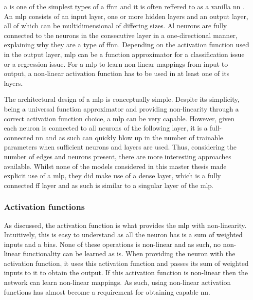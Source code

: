 a  is one of the simplest types of a \gls{ffnn} and it is often reffered to as a vanilla \gls{nn} \citep{ml_book}.
An \gls{mlp} consists of an input layer, one or more hidden layers and an output layer, all of which can be multidimensional of differing sizes.
Al neurons are fully connected to the neurons in the consecutive layer in a one-directional manner, explaining why they are a type of \gls{ffnn}.
Depending on the activation function used in the output layer, \gls{mlp} can be a function approximator for a classification issue or a regression issue.
For a \gls{mlp} to learn non-linear mappings from input to output, a non-linear activation function has to be used in at least one of its layers.

The architectural design of a \gls{mlp} is conceptually simple.
Despite its simplicity, being a universal function approximator and providing non-linearity through a correct activation function choice, a \gls{mlp} can be very capable.
However, given each neuron is connected to all neurons of the following layer, it is a full-connected \gls{nn} and as such can quickly blow up in the number of trainable parameters when sufficient neurons and layers are used.
Thus, considering the number of edges and neurons present, there are more interesting approaches available.
Whilst none of the models considered in this master thesis made explicit use of a \gls{mlp}, they did make use of a dense layer, which is a fully connected \gls{ff} layer and as such is similar to a singular layer of the \gls{mlp}.






\subsubsection{Activation functions}
\label{subsubsec:processing_signals_ml_and_dl_dl_classifiers_af}

As discussed, the activation function is what provides the \gls{mlp} with non-linearity.
Intuitively, this is easy to understand as all the neuron has is a sum of weighted inputs and a bias.
None of these operations is non-linear and as such, no non-linear functionality can be learned as is.
When providing the neuron with the activation function, it uses this activation function and passes its sum of weighted inputs to it to obtain the output.
If this activation function is non-linear then the network can learn non-linear mappings.
As such, using non-linear activation functions has almost become a requirement for obtaining capable \gls{nn}.

